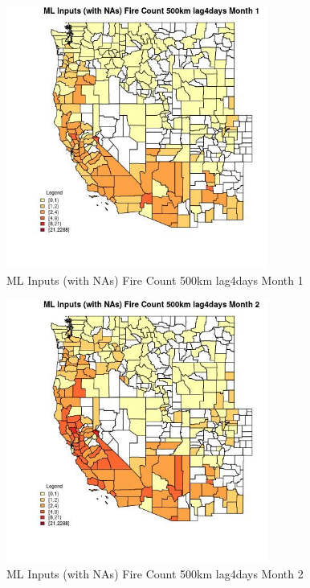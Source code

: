 \begin{figure} 
\centering  
\includegraphics[width=0.77\textwidth]{Code_Outputs/Report_ML_input_PM25_Step4_part_e_de_duplicated_aves_compiled_2019-05-21wNAs_CountyFire_Count_500km_lag4daysmedianMonth1.jpg} 
\caption{\label{fig:Report_ML_input_PM25_Step4_part_e_de_duplicated_aves_compiled_2019-05-21wNAsCountyFire_Count_500km_lag4daysmedianMonth1}ML Inputs (with NAs) Fire Count 500km lag4days Month 1} 
\end{figure} 
 

\begin{figure} 
\centering  
\includegraphics[width=0.77\textwidth]{Code_Outputs/Report_ML_input_PM25_Step4_part_e_de_duplicated_aves_compiled_2019-05-21wNAs_CountyFire_Count_500km_lag4daysmedianMonth2.jpg} 
\caption{\label{fig:Report_ML_input_PM25_Step4_part_e_de_duplicated_aves_compiled_2019-05-21wNAsCountyFire_Count_500km_lag4daysmedianMonth2}ML Inputs (with NAs) Fire Count 500km lag4days Month 2} 
\end{figure} 
 

